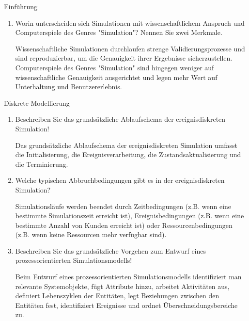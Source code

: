 \documentclass{article}
\begin{document}
\begin{exercise}{Einführung}
\begin{enumerate}
    \item Worin unterscheiden sich Simulationen mit wissenschaftlichem Anspruch und Computerspiele des Genres "Simulation"? Nennen Sie zwei Merkmale.
          \begin{solution}
            Wissenschaftliche Simulationen durchlaufen strenge Validierungsprozesse und sind reproduzierbar, um die Genauigkeit ihrer Ergebnisse sicherzustellen. Computerspiele des Genres "Simulation" sind hingegen weniger auf wissenschaftliche Genauigkeit ausgerichtet und legen mehr Wert auf Unterhaltung und Benutzererlebnis.
          \end{solution}
  \end{enumerate}
\end{exercise}

\begin{exercise}{Diskrete Modellierung}
  \begin{enumerate}
    \item Beschreiben Sie das grundsätzliche Ablaufschema der ereignisdiskreten Simulation!
          \begin{solution}
            Das grundsätzliche Ablaufschema der ereignisdiskreten Simulation umfasst die Initialisierung, die Ereignisverarbeitung, die Zustandsaktualisierung und die Terminierung.
          \end{solution}

    \item Welche typischen Abbruchbedingungen gibt es in der ereignisdiskreten Simulation?
          \begin{solution}
            Simulationsläufe werden beendet durch Zeitbedingungen (z.B. wenn eine bestimmte Simulationszeit erreicht ist), Ereignisbedingungen (z.B. wenn eine bestimmte Anzahl von Kunden erreicht ist) oder Ressourcenbedingungen (z.B. wenn keine Ressourcen mehr verfügbar sind).
          \end{solution}

    \item Beschreiben Sie das grundsätzliche Vorgehen zum Entwurf eines prozessorientierten Simulationsmodells!
          \begin{solution}
            Beim Entwurf eines prozessorientierten Simulationsmodells identifiziert man relevante Systemobjekte, fügt Attribute hinzu, arbeitet Aktivitäten aus, definiert Lebenszyklen der Entitäten, legt Beziehungen zwischen den Entitäten fest, identifiziert Ereignisse und ordnet Überschneidungsbereiche zu.
          \end{solution}


\end{enumerate}
\end{exercise}
\end{document}
